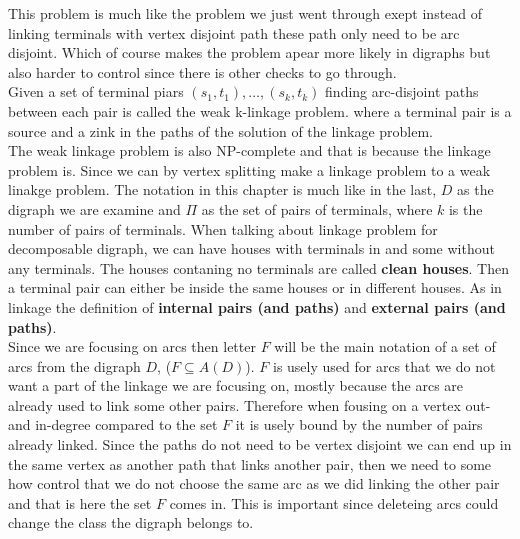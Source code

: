 This problem is much like the problem we just went through exept instead of linking terminals with vertex disjoint path these path only need to be arc disjoint.
Which of course makes the problem apear more likely in digraphs but also harder to control since there is other checks to go through. \\
Given a set of terminal piars $(s_1,t_1),\dots ,(s_k,t_k)$ finding arc-disjoint paths between each pair is called the weak k-linkage problem.
where a terminal  pair is a source and a zink in the paths of the solution of the linkage problem. \\
The weak linkage problem is also NP-complete and that is because the linkage problem is. Since we can by vertex splitting make a linkage problem to a weak linakge problem. 
The notation in this chapter is much like in the last, $D$ as the digraph we are examine and $\Pi$ as the set of pairs of terminals, where $k$ is the number of pairs of terminals. 
When talking about linkage problem for decomposable digraph, we can have houses with terminals in and some without any terminals. 
The houses contaning no terminals are called \textbf{clean houses}.
Then a terminal pair can either be inside the same houses or in different houses. 
As in linkage the definition of \textbf{internal pairs (and paths)} and \textbf{external pairs (and paths)}.\\
Since we are focusing on arcs then letter $F$ will be the main notation of a set of arcs from the digraph $D$, ($F\subseteq A(D)$). 
$F$ is usely used for arcs that we do not want a part of the linkage we are focusing on, mostly because the arcs are already used to link some other pairs. 
Therefore when fousing on a vertex out- and in-degree compared to the set $F$ it is usely bound by the number of pairs already linked. 
Since the paths do not need to be vertex disjoint we can end up in the same vertex as another path that links another pair, then we need to some how control that we do not choose the same arc as we did linking the other pair and that is here the set $F$ comes in.  
This is important since deleteing arcs could change the class the digraph belongs to. 
